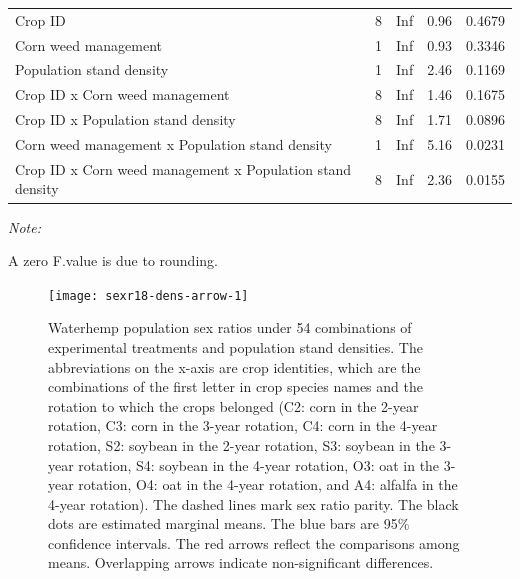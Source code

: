\documentclass[
]{article}
\begin{document}
\begin{table}[H]
{\begin{tabular}[t]{lrrrl}
\hspace{1em}Crop ID & 8 & Inf & 0.96 & 0.4679\\
\hspace{1em}Corn weed management & 1 & Inf & 0.93 & 0.3346\\
\hspace{1em}Population stand density & 1 & Inf & 2.46 & 0.1169\\
\hspace{1em}Crop ID x Corn weed management & 8 & Inf & 1.46 & 0.1675\\
\hspace{1em}Crop ID x Population stand density & 8 & Inf & 1.71 & 0.0896\\
\hspace{1em}Corn weed management x Population stand density & 1 & Inf & 5.16 & 0.0231\\
\hspace{1em}Crop ID x Corn weed management x Population stand density & 8 & Inf & 2.36 & 0.0155\\
\bottomrule
\end{tabular}}
\begin{tablenotes}[para]
\item \textit{Note: } 
\item A zero F.value is due to rounding.
\end{tablenotes}
\end{table}

\begin{figure}
\texttt{[image: sexr18-dens-arrow-1]} \caption{Waterhemp population sex ratios under 54 combinations of experimental treatments and population stand densities. The abbreviations on the x-axis are crop identities, which are the combinations of the first letter in crop species names and the rotation to which the crops belonged (C2: corn in the 2-year rotation, C3: corn in the 3-year rotation, C4: corn in the 4-year rotation, S2: soybean in the 2-year rotation, S3: soybean in the 3-year rotation, S4: soybean in the 4-year rotation, O3: oat in the 3-year rotation, O4: oat in the 4-year rotation, and A4: alfalfa in the 4-year rotation). The dashed lines mark sex ratio parity. The black dots are estimated marginal means. The blue bars are 95\% confidence intervals. The red arrows reflect the comparisons among means. Overlapping arrows indicate non-significant differences.}\label{fig:sexr18-dens-arrow}
\end{figure}
\end{document}
